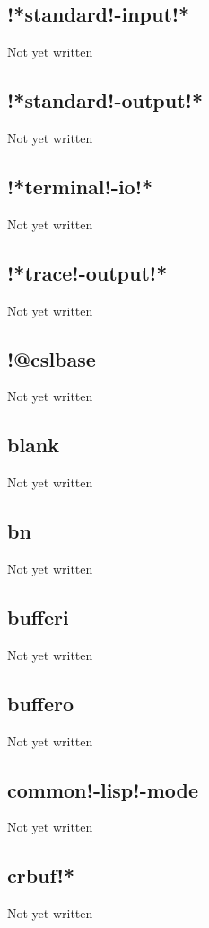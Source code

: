 \documentclass[a4paper,11pt]{article}
\begin{document}
\subsection{\ttfamily !*standard!-input!*}
Not yet written

\subsection{\ttfamily !*standard!-output!*}
Not yet written

\subsection{\ttfamily !*terminal!-io!*}
Not yet written

\subsection{\ttfamily !*trace!-output!*}
Not yet written

\subsection{\ttfamily !@cslbase}
Not yet written

\subsection{\ttfamily blank}
Not yet written

\subsection{\ttfamily bn}
Not yet written

\subsection{\ttfamily bufferi}
Not yet written

\subsection{\ttfamily buffero}
Not yet written

\subsection{\ttfamily common!-lisp!-mode}
Not yet written

\subsection{\ttfamily crbuf!*}
Not yet written
\end{document}

